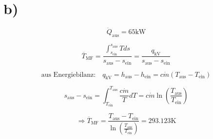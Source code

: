 

\section*{b)}

\[
\dot{Q}_{\text{aus}} = 65 \text{kW}
\]

\[
\overline{T}_{\text{MF}} = \frac{\int_{s_{\text{ein}}}^{s_{\text{aus}}} T ds}{s_{\text{aus}} - s_{\text{ein}}} = \frac{q_{\text{kV}}}{s_{\text{aus}} - s_{\text{ein}}}
\]

\[
\text{aus Energiebilanz:} \quad q_{\text{kV}} = h_{\text{aus}} - h_{\text{ein}} = c \dot{m} (T_{\text{aus}} - T_{\text{ein}})
\]

\[
s_{\text{aus}} - s_{\text{ein}} = \int_{T_{\text{ein}}}^{T_{\text{aus}}} \frac{c \dot{m}}{T} dT = c \dot{m} \ln \left( \frac{T_{\text{aus}}}{T_{\text{ein}}} \right)
\]

\[
\Rightarrow \overline{T}_{\text{MF}} = \frac{T_{\text{aus}} - T_{\text{ein}}}{\ln \left( \frac{T_{\text{aus}}}{T_{\text{ein}}} \right)} = 293.123 \text{K}
\]